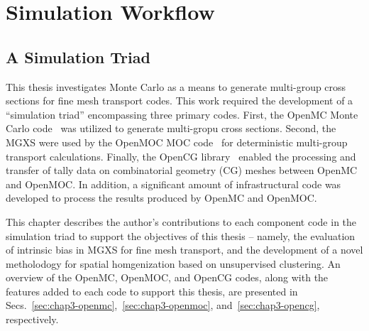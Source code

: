 \chapter{Simulation Workflow}
\label{chap:workflow}

\section{A Simulation Triad}
\label{chap3:triad}

This thesis investigates Monte Carlo as a means to generate multi-group cross sections for fine mesh transport codes. This work required the development of a ``simulation triad'' encompassing three primary codes. First, the OpenMC Monte Carlo code~\cite{romano2013openmc} was utilized to generate multi-gropu cross sections. Second, the \ac{MGXS} were used by the OpenMOC \ac{MOC} code~\cite{boyd2014openmoc} for deterministic multi-group transport calculations. Finally, the OpenCG library~\cite{boyd2015opencg} enabled the processing and transfer of tally data on combinatorial geometry (CG) meshes between OpenMC and OpenMOC. In addition, a significant amount of infrastructural code was developed to process the results produced by OpenMC and OpenMOC. 

This chapter describes the author's contributions to each component code in the simulation triad to support the objectives of this thesis -- namely, the evaluation of intrinsic bias in \ac{MGXS} for fine mesh transport, and the development of a novel metholodogy for spatial homgenization based on unsupervised clustering. An overview of the OpenMC, OpenMOC, and OpenCG codes, along with the features added to each code to support this thesis, are presented in Secs.~\ref{sec:chap3-openmc},~\ref{sec:chap3-openmoc}, and~\ref{sec:chap3-opencg}, respectively.


  


